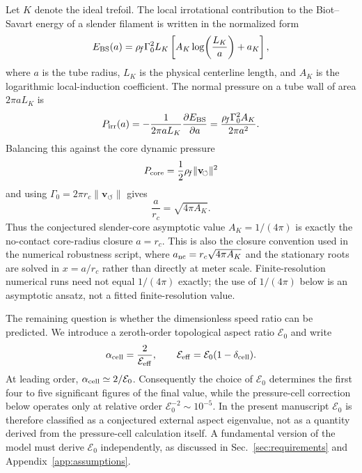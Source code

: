 \documentclass[aps,pra,preprint,longbibliography,nofootinbib]{revtex4-2}
\newcommand{\vnorm}{\lVert\mathbf{v}_{\!\boldsymbol{\circlearrowleft}}\rVert} %
\newcommand{\rhof}{\rho_{\!f}}                   %
\newcommand{\Gz}{\Gamma_0}                       %
\newcommand{\Et}{\mathcal{E}_0}                    %
\newcommand{\AK}{A_K}                                %
\begin{document}
Let $K$ denote the ideal trefoil.  The local irrotational contribution to
the Biot--Savart energy of a slender filament is written in the normalized
form
\begin{equation}
  E_{\rm BS}(a)
  = \rhof \Gz^2 L_K
    \left[\AK\log\!\left(\frac{L_K}{a}\right)+a_K\right],
  \label{eq:bs_log_energy}
\end{equation}
where $a$ is the tube radius, $L_K$ is the physical centerline length, and
$\AK$ is the logarithmic local-induction coefficient.  The normal pressure
on a tube wall of area $2\pi aL_K$ is
\begin{equation}
  P_{\rm irr}(a)
  = -\frac{1}{2\pi aL_K}\frac{\partial E_{\rm BS}}{\partial a}
  = \frac{\rhof\Gz^2\AK}{2\pi a^2}.
  \label{eq:pirr_from_bs}
\end{equation}
Balancing this against the core dynamic pressure
\begin{equation}
  P_{\rm core}=\frac{1}{2}\rhof\vnorm^2
  \label{eq:pcore_dynamic}
\end{equation}
and using $\Gz=2\pi r_c\vnorm$ gives
\begin{equation}
  \frac{a}{r_c}=\sqrt{4\pi\AK}.
  \label{eq:anc_from_AK}
\end{equation}
Thus the conjectured slender-core asymptotic value $\AK=1/(4\pi)$ is
exactly the no-contact core-radius closure $a=r_c$.  This is also the
closure convention used in the numerical robustness script, where
$a_{\rm nc}=r_c\sqrt{4\pi A_K}$ and the stationary roots are solved in
$x=a/r_c$ rather than directly at meter scale.  Finite-resolution numerical
runs need not equal $1/(4\pi)$ exactly; the use of $1/(4\pi)$ below is an
asymptotic ansatz, not a fitted finite-resolution value.

The remaining question is whether the dimensionless speed ratio can be
predicted.  We introduce a zeroth-order topological aspect ratio $\Et$ and
write
\begin{equation}
  \alpha_{\rm cell}=\frac{2}{\mathcal E_{\rm eff}},
  \qquad
  \mathcal E_{\rm eff}=\Et(1-\delta_{\rm cell}).
  \label{eq:alpha_cell_def}
\end{equation}
At leading order, $\alpha_{\rm cell}\simeq2/\Et$.  Consequently the
choice of $\Et$ determines the first four to five significant figures of
the final value, while the pressure-cell correction below operates only at
relative order $\Et^{-2}\sim10^{-5}$.  In the present manuscript $\Et$ is
therefore classified as a conjectured external aspect eigenvalue, not as a
quantity derived from the pressure-cell calculation itself.  A fundamental
version of the model must derive $\Et$ independently, as discussed in
Sec.~\ref{sec:requirements} and Appendix~\ref{app:assumptions}.
\end{document}
